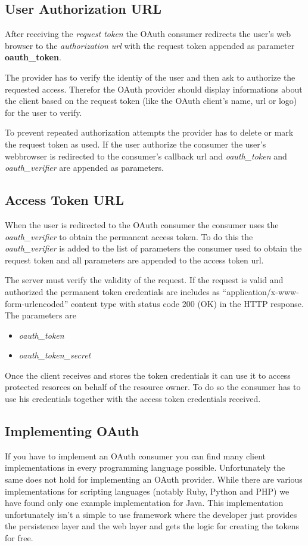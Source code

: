 \subsection{User Authorization URL}

After receiving the \emph{request token} the OAuth consumer
redirects the user's web browser to the \emph{authorization url}
with the request token appended as parameter
\textbf{oauth\_token}.

The provider has to verify the identiy of the user and then ask to
authorize the requested access. Therefor the OAuth provider should
display informations about the client based on the request token
(like the OAuth client's name, url or logo) for the user to
verify.

To prevent repeated authorization attempts the provider has to
delete or mark the request token as used. If the user authorize the
consumer the user's webbrowser is redirected to the consumer's
callback url and \emph{oauth\_token} and \emph{oauth\_verifier} are
appended as parameters.

\subsection{Access Token URL}

When the user is redirected to the OAuth consumer the consumer uses
the \emph{oauth\_verifier} to obtain the permanent access token. To
do this the \emph{oauth\_verifier} is added to the list of
parameters the consumer used to obtain the request token and all
parameters are appended to the access token url.

The server must verify the validity of the request. If the request
is valid and authorized the permanent token credentials are
includes as ``application/x-www-form-urlencoded'' content type with
status code 200 (OK) in the HTTP response. The parameters are

\begin{itemize}
\item
  \emph{oauth\_token}
\item
  \emph{oauth\_token\_secret}
\end{itemize}
Once the client receives and stores the token credentials it can
use it to access protected resorces on behalf of the resource
owner. To do so the consumer has to use his credentials together
with the access token credentials received.

\subsection{Implementing OAuth}

If you have to implement an OAuth consumer you can find many client
implementations in every programming language possible.
Unfortunately the same does not hold for implementing an OAuth
provider. While there are various implementations for scripting
languages (notably Ruby, Python and PHP) we have found only one
example implementation for Java. This implementation unfortunately
isn't a simple to use framework where the developer just provides
the persistence layer and the web layer and gets the logic for
creating the tokens for free.